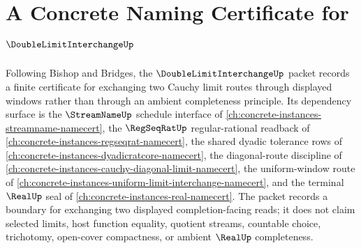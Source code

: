 \chapter{A Concrete Naming Certificate for $\DoubleLimitInterchangeUp$}
\label{ch:concrete-instances-double-limit-interchange-namecert}

Following Bishop and Bridges, the $\DoubleLimitInterchangeUp$ packet records a finite certificate for exchanging two Cauchy limit routes through displayed windows rather than through an ambient completeness principle. Its dependency surface is the $\StreamNameUp$ schedule interface of \autoref{ch:concrete-instances-streamname-namecert}, the $\RegSeqRatUp$ regular-rational readback of \autoref{ch:concrete-instances-regseqrat-namecert}, the shared dyadic tolerance rows of \autoref{ch:concrete-instances-dyadicratcore-namecert}, the diagonal-route discipline of \autoref{ch:concrete-instances-cauchy-diagonal-limit-namecert}, the uniform-window route of \autoref{ch:concrete-instances-uniform-limit-interchange-namecert}, and the terminal $\RealUp$ seal of \autoref{ch:concrete-instances-real-namecert}. The packet records a boundary for exchanging two displayed completion-facing reads; it does not claim selected limits, host function equality, quotient streams, countable choice, trichotomy, open-cover compactness, or ambient $\RealUp$ completeness.

